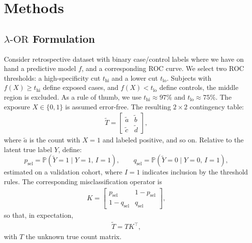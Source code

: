 \documentclass[pdflatex,sn-mathphys-num]{sn-jnl}%
\def\EQSP{3pt}
\newcommand{\cgather}[2][\EQSP]{\begingroup\setlength\abovedisplayskip{#1}\setlength\belowdisplayskip{#1}\begin{gather} #2 \end{gather}\endgroup\noindent}
\newcommand{\SPOR}{\textrm{$\lambda$-OR}}
\theoremstyle{thmstyleone}%
\theoremstyle{thmstyletwo}%
\theoremstyle{thmstylethree}%
\begin{document}
\section{Methods}
\subsection{$\SPOR$ Formulation}
Consider retrospective dataset with binary case/control labels where we have on hand a  predictive model $f$, and a corresponding ROC curve. We select two  ROC thresholds: a high-specificity cut $t_{\mathrm{hi}}$ and a lower cut $t_{\mathrm{lo}}$. Subjects with $f(X) \ge t_{\mathrm{hi}}$ define exposed cases, and  $f(X) < t_{\mathrm{lo}}$ define controls, the middle region is excluded. As a rule of thumb, we use $t_{\mathrm{hi}} \approx 97\%$ and $t_{\mathrm{lo}} \approx 75\%$. The exposure $X\in\{0,1\}$ is assumed error-free. The resulting $2\times 2$ contingency table:
%
\cgather{
\tilde{T} = \begin{bmatrix}
\tilde{a} & \tilde{b} \\
\tilde{c} & \tilde{d}
\end{bmatrix},
}
where $\tilde{a}$ is the count with $X=1$ and labeled positive, and so on. Relative to the latent true label $Y$, define:
\[
p_{\text{sel}} = \mathbb{P}(\tilde{Y}=1 \mid Y=1,\, I=1), \qquad
q_{\text{sel}} = \mathbb{P}(\tilde{Y}=0 \mid Y=0,\, I=1),
\]
estimated on a validation cohort, where $I=1$ indicates inclusion by the threshold rules. The corresponding misclassification operator is
\cgather{
K = \begin{bmatrix}
p_{\text{sel}} & 1 - p_{\text{sel}} \\
1 - q_{\text{sel}} & q_{\text{sel}}
\end{bmatrix},
}
so that, in expectation,
\cgather{
\tilde{T} = T K^\top,
}
with $T$ the unknown true count matrix.
\end{document}
